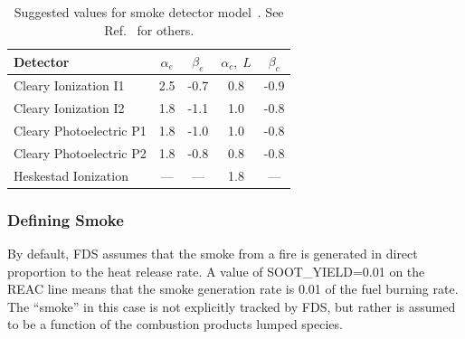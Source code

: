 \documentclass[11pt]{book}
\begin{document}
\begin{table}[ht]
\caption[Suggested values for smoke detector model]{Suggested values for smoke detector model~\cite{Cleary:IAFSS6}. See Ref.~\cite{SFPE} for others.}
\vspace{0.1in}
\label{tab:sdvalues}
\begin{center}
\begin{tabular}{|l||c|c|c|c|}
\hline
Detector                      & $\alpha_e$  &  $\beta_e$   &  $\alpha_c, \; L$   &  $\beta_c$  \\ \hline \hline
Cleary Ionization    I1       & 2.5         & -0.7         &  0.8                &  -0.9      \\ \hline
Cleary Ionization    I2       & 1.8         & -1.1         &  1.0                &  -0.8      \\ \hline
Cleary Photoelectric P1       & 1.8         & -1.0         &  1.0                &  -0.8      \\ \hline
Cleary Photoelectric P2       & 1.8         & -0.8         &  0.8                &  -0.8      \\ \hline
Heskestad Ionization          & ---         & ---          &  1.8                &  ---       \\ \hline\end{tabular}
\end{center}
\end{table}

\subsubsection{Defining Smoke}
\label{info:alternative_smoke}

By default, FDS assumes that the smoke from a fire is generated in direct proportion to the heat release rate. A value of {\ct SOOT\_YIELD=0.01} on the {\ct REAC} line means that the smoke generation rate is 0.01 of the fuel burning rate. The ``smoke'' in this case is not explicitly tracked by FDS, but rather is assumed to be a function of the combustion products lumped species.
\end{document}
